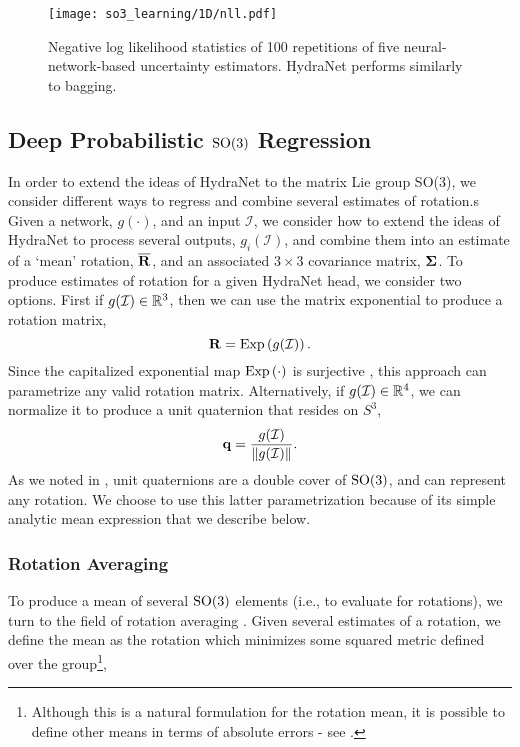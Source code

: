\begin{figure}
	\centering
	\texttt{[image: so3\_learning/1D/nll.pdf]}
	\vspace{-1em}
	\caption{Negative log likelihood statistics of 100 repetitions of five neural-network-based uncertainty estimators. HydraNet performs similarly to bagging. }
	\label{fig:noise-free-boxplot}
\end{figure}

\subsection{Deep Probabilistic $\mathrm{SO}(3)$ Regression}

In order to extend the ideas of HydraNet to the matrix Lie group SO(3), we
consider different ways to regress and combine several estimates of rotation.s
Given a network, $g(\cdot)$, and an input $\mathcal{I}$, we consider how to extend the ideas of HydraNet to process several outputs, $g_i(\mathcal{I})$, and combine them into an estimate of a `mean' rotation, $\overline{\boldsymbol{\mathbf{R}}}$, and an associated $3\times3$ covariance matrix, $\boldsymbol{\mathbf{\Sigma}}$.  To produce estimates of rotation for a given HydraNet head, we consider two options. First if $g(\mathcal{I}) \in \mathbb{R}^3$, then we can use the matrix exponential to produce a rotation matrix,
\begin{equation}
	\boldsymbol{\mathbf{R}} = \mathrm{Exp}\left({g(\mathcal{I})}\right).
\end{equation}
Since the capitalized exponential map $\mathrm{Exp}\left({\cdot}\right)$ is surjective \citep{Barfoot2017-ri,Sola2018-kg}, this approach can parametrize any valid rotation matrix. Alternatively, if $g(\mathcal{I}) \in \mathbb{R}^4$, we can normalize it to produce a unit quaternion that resides on $S^3$,
\begin{equation}
\label{eq:quat_output}
	\boldsymbol{\mathbf{q}} = \frac{g(\mathcal{I})}{\left\Vert g(\mathcal{I})\right\Vert}.
\end{equation}
As we noted in , unit quaternions are a double cover of $\mathrm{SO}(3)$, and can represent any rotation. We choose to use this latter parametrization because of its simple analytic mean expression that we describe below.

\subsubsection{Rotation Averaging}

To produce a mean of several $\mathrm{SO}(3)$ elements (i.e., to evaluate  for rotations), we turn to the field of rotation averaging \citep{Hartley2013-rc}. Given several estimates of a rotation, we define the mean as the rotation which minimizes some squared metric defined over the group\footnote{Although this is a natural formulation for the rotation mean, it is possible to define other means in terms of absolute errors - see \citep{Hartley2013-rc}.},

